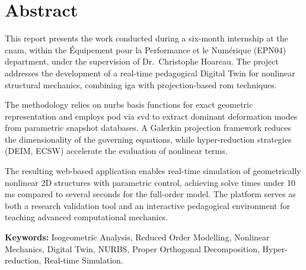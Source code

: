 \documentclass[12pt,a4paper,twoside]{report}
\begin{document}



\chapter*{Abstract}
This report presents the work conducted during a six-month internship at the \acrfull{cnam}, within the Équipement pour la Performance et le Numérique (EPN04) department, under the supervision of Dr.\ Christophe Hoareau. The project addresses the development of a real-time pedagogical Digital Twin for nonlinear structural mechanics, combining \acrfull{iga} with projection-based \acrfull{rom} techniques.

The methodology relies on \acrfull{nurbs} basis functions for exact geometric representation and employs \acrfull{pod} via \acrfull{svd} to extract dominant deformation modes from parametric snapshot databases. A Galerkin projection framework reduces the dimensionality of the governing equations, while hyper-reduction strategies (DEIM, ECSW) accelerate the evaluation of nonlinear terms.

The resulting web-based application enables real-time simulation of geometrically nonlinear 2D structures with parametric control, achieving solve times under 10\,ms compared to several seconds for the full-order model. The platform serves as both a research validation tool and an interactive pedagogical environment for teaching advanced computational mechanics.

\vspace{1cm}
\noindent\textbf{Keywords:} Isogeometric Analysis, Reduced Order Modelling, Nonlinear Mechanics, Digital Twin, NURBS, Proper Orthogonal Decomposition, Hyper-reduction, Real-time Simulation.

\tableofcontents
\listoffigures
\listoftables
\printglossary[type=\acronymtype, title=List of Acronyms]

\cleardoublepage
{}








\appendix




\end{document}
